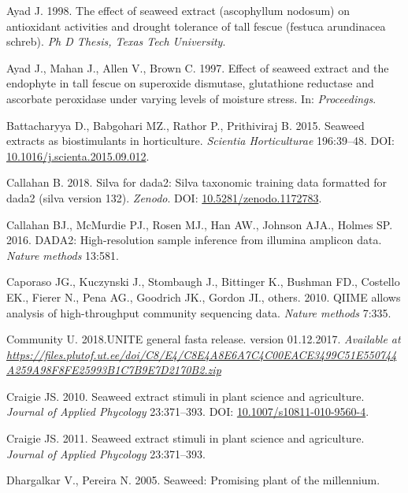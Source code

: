 \documentclass[11pt,]{article}
\begin{document}
\hypertarget{ref-ayad1998effect}{}
Ayad J. 1998. The effect of seaweed extract (ascophyllum nodosum) on
antioxidant activities and drought tolerance of tall fescue (festuca
arundinacea schreb). \emph{Ph D Thesis, Texas Tech University}.

\hypertarget{ref-ayad1997effect}{}
Ayad J., Mahan J., Allen V., Brown C. 1997. Effect of seaweed extract
and the endophyte in tall fescue on superoxide dismutase, glutathione
reductase and ascorbate peroxidase under varying levels of moisture
stress. In: \emph{Proceedings}.

\hypertarget{ref-Battacharyya2015}{}
Battacharyya D., Babgohari MZ., Rathor P., Prithiviraj B. 2015. Seaweed
extracts as biostimulants in horticulture. \emph{Scientia Horticulturae}
196:39--48. DOI:
\href{https://doi.org/10.1016/j.scienta.2015.09.012}{10.1016/j.scienta.2015.09.012}.

\hypertarget{ref-silva}{}
Callahan B. 2018. Silva for dada2: Silva taxonomic training data
formatted for dada2 (silva version 132). \emph{Zenodo}. DOI:
\href{https://doi.org/10.5281/zenodo.1172783}{10.5281/zenodo.1172783}.

\hypertarget{ref-callahan2016dada2}{}
Callahan BJ., McMurdie PJ., Rosen MJ., Han AW., Johnson AJA., Holmes SP.
2016. DADA2: High-resolution sample inference from illumina amplicon
data. \emph{Nature methods} 13:581.

\hypertarget{ref-caporaso2010qiime}{}
Caporaso JG., Kuczynski J., Stombaugh J., Bittinger K., Bushman FD.,
Costello EK., Fierer N., Pena AG., Goodrich JK., Gordon JI., others.
2010. QIIME allows analysis of high-throughput community sequencing
data. \emph{Nature methods} 7:335.

\hypertarget{ref-UNITE2017}{}
Community U. 2018.UNITE general fasta release. version 01.12.2017.
\emph{Available at}
\emph{\url{https://files.plutof.ut.ee/doi/C8/E4/C8E4A8E6A7C4C00EACE3499C51E550744A259A98F8FE25993B1C7B9E7D2170B2.zip}}

\hypertarget{ref-Craigie2010}{}
Craigie JS. 2010. Seaweed extract stimuli in plant science and
agriculture. \emph{Journal of Applied Phycology} 23:371--393. DOI:
\href{https://doi.org/10.1007/s10811-010-9560-4}{10.1007/s10811-010-9560-4}.

\hypertarget{ref-craigie2011seaweed}{}
Craigie JS. 2011. Seaweed extract stimuli in plant science and
agriculture. \emph{Journal of Applied Phycology} 23:371--393.

\hypertarget{ref-dhargalkar2005seaweed}{}
Dhargalkar V., Pereira N. 2005. Seaweed: Promising plant of the
millennium.
\end{document}
